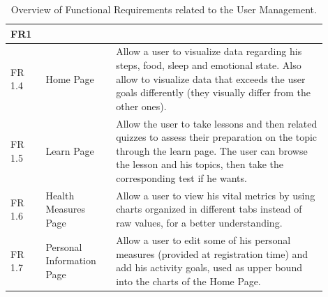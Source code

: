 \begin{table}[h!]
    \setstretch{\myspacing}
    \centering
    \begin{tabular}{|>{\raggedright\arraybackslash}p{0.1\linewidth}|>{\raggedright\arraybackslash}p{0.2\linewidth}|>{\raggedright\arraybackslash}p{0.6\linewidth}|}
        \hline
        \textbf{FR1} & \multicolumn{2}{>{\centering\arraybackslash}p{0.7\linewidth}|}{\textbf{User Management}} \\
        \hline
        FR 1.4 & Home Page & Allow a user to visualize data regarding his steps, food, sleep and emotional state. Also allow to visualize data that exceeds the user goals differently (they visually differ from the other ones). \\
        \hline
        FR 1.5 & Learn Page & Allow the user to take lessons and then related quizzes to assess their preparation on the topic through the learn page. The user can browse the lesson and his topics, then take the corresponding test if he wants. \\
        \hline
        FR 1.6 & Health Measures Page & Allow a user to view his vital metrics by using charts organized in different tabs instead of raw values, for a better understanding. \\
        \hline
        FR 1.7 & Personal Information Page & Allow a user to edit some of his personal measures (provided at registration time) and add his activity goals, used as upper bound into the charts of the Home Page. \\
        \hline
    \end{tabular}
    \caption{Overview of Functional Requirements related to the User Management.}
\end{table}


